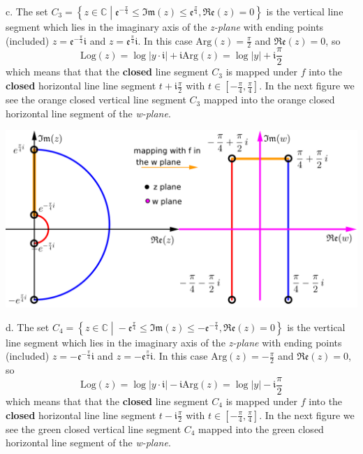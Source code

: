\documentclass[11pt]{amsart}
\newcommand{\dsp}{\displaystyle}
\newcommand{\BBC}{\mathbb{C}}\newcommand{\mi}{\mathfrak{i}}
\begin{document}
c. The set $\dsp
C_3=\left\{z\in\BBC\;\left|\;\mathfrak{e}^{-\frac{\pi}{4}}\leq\mathfrak{Im}
(z)\leq\mathfrak { e } ^ {\frac{\pi}{4}}, \mathfrak{Re}(z)=0\right.\right\}$ is the 
vertical line segment which lies in the 
imaginary axis of the \textit{z-plane} with ending points (included)
$\dsp z=\mathfrak{e}^{-\frac{\pi}{4}}\mi$ and $z=\mathfrak{e}^{\frac{\pi}{4}}\mi$. In this case $\dsp\textrm{Arg}(z)=\frac{\pi}{2}$ and 
$\dsp\mathfrak{Re}(z)=0$, so 
\[\textrm{Log}(z)=\log|y\cdot\mi|+\mi\text{Arg}(z)=\log|y|+\mi\frac{\pi}{2}\]
which means that that the \textbf{closed} line segment $C_3$ is mapped under $f$ into the 
\textbf{closed} horizontal line line segment $\dsp t+\mi\frac{\pi}{2}$ with 
$\dsp t\in\left[-\frac{\pi}{4},\frac{\pi}{4}\right]$. In the next figure we see the 
orange closed vertical line segment $C_3$ mapped into the 
orange closed horizontal line segment of the \textit{w-plane}.
\begin{center}\includegraphics{2c.png}\end{center}
d.  The set $C_4=\left\{z\in\BBC\;\left|\;-\mathfrak{e}^{\frac{\pi}{4}}\leq\mathfrak{Im}
(z)\leq-\mathfrak { e }^{-\frac{\pi}{4}}, \mathfrak{Re}(z)=0
\right.\right\}$ is the vertical line segment which lies in the imaginary axis of the 
\textit{z-plane} with ending points (included) 
$\dsp z=-\mathfrak{e}^{-\frac{\pi}{4}}\mi$ and $\dsp z=-\mathfrak{e}^{\frac{\pi}{4}}\mi$. In this case $\dsp\textrm{Arg}(z)=-\frac{\pi}{2}$ 
and $\dsp\mathfrak{Re}(z)=0$, so \[\textrm{Log}(z)=\log|y\cdot 
\mi|−\mi\text{Arg}(z)=\log|y|−\mi\frac{\pi}{2}\]
which means that that the \textbf{closed} line segment $C_4$ is mapped under $f$ into the 
\textbf{closed} horizontal line line segment 
$\dsp t−\mi\frac{\pi}{2}$ with $\dsp t\in\left[-\frac{\pi}{4},\frac{\pi}{4}\right]$. In 
the next figure we see the green closed vertical line 
segment $C_4$ mapped into the green closed horizontal line segment of the \textit{w-plane}.
\end{document}
